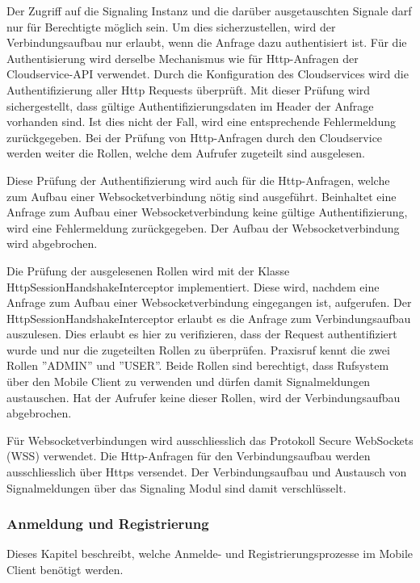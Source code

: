 Der Zugriff auf die Signaling Instanz und die darüber ausgetauschten Signale darf nur für Berechtigte möglich sein.
Um dies sicherzustellen, wird der Verbindungsaufbau nur erlaubt, wenn die Anfrage dazu authentisiert ist.
Für die Authentisierung wird derselbe Mechanismus wie für Http-Anfragen der Cloudservice-API verwendet.
Durch die Konfiguration des Cloudservices wird die Authentifizierung aller Http Requests überprüft.
Mit dieser Prüfung wird sichergestellt, dass gültige Authentifizierungsdaten im Header der Anfrage vorhanden sind.
Ist dies nicht der Fall, wird eine entsprechende Fehlermeldung zurückgegeben.
Bei der Prüfung von Http-Anfragen durch den Cloudservice werden weiter die Rollen, welche dem Aufrufer zugeteilt sind ausgelesen.

Diese Prüfung der Authentifizierung wird auch für die Http-Anfragen, welche zum Aufbau einer Websocketverbindung nötig sind ausgeführt.
Beinhaltet eine Anfrage zum Aufbau einer Websocketverbindung keine gültige Authentifizierung, wird eine Fehlermeldung zurückgegeben.
Der Aufbau der Websocketverbindung wird abgebrochen.

Die Prüfung der ausgelesenen Rollen wird mit der Klasse HttpSessionHandshakeInterceptor implementiert.
Diese wird, nachdem eine Anfrage zum Aufbau einer Websocketverbindung eingegangen ist, aufgerufen.
Der HttpSessionHandshakeInterceptor erlaubt es die Anfrage zum Verbindungsaufbau auszulesen.
Dies erlaubt es hier zu verifizieren, dass der Request authentifiziert wurde und nur die zugeteilten Rollen zu überprüfen.
Praxisruf kennt die zwei Rollen ''ADMIN'' und ''USER''.
Beide Rollen sind berechtigt, dass Rufsystem über den Mobile Client zu verwenden und dürfen damit Signalmeldungen austauschen.
Hat der Aufrufer keine dieser Rollen, wird der Verbindungsaufbau abgebrochen.

Für Websocketverbindungen wird ausschliesslich das Protokoll Secure WebSockets (WSS) verwendet.
Die Http-Anfragen für den Verbindungsaufbau werden ausschliesslich über Https versendet.
Der Verbindungsaufbau und Austausch von Signalmeldungen über das Signaling Modul sind damit verschlüsselt.

\clearpage

\subsubsection{Anmeldung und Registrierung}

Dieses Kapitel beschreibt, welche Anmelde- und Registrierungsprozesse im Mobile Client benötigt werden.

